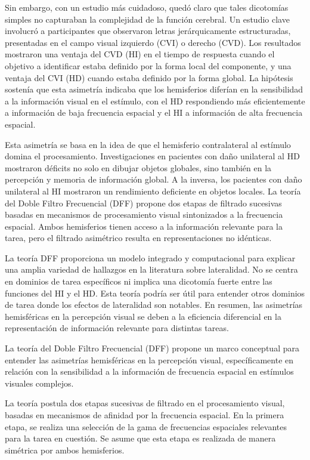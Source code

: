 \documentclass{article}
\begin{document}
	Sin embargo, con un estudio más cuidadoso, quedó claro que tales dicotomías simples no capturaban la complejidad de la función cerebral. Un estudio clave involucró a participantes que observaron letras jerárquicamente estructuradas, presentadas en el campo visual izquierdo (CVI) o derecho (CVD). Los resultados mostraron una ventaja del CVD (HI) en el tiempo de respuesta cuando el objetivo a identificar estaba definido por la forma local del componente, y una ventaja del CVI (HD) cuando estaba definido por la forma global. La hipótesis sostenía que esta asimetría indicaba que los hemisferios diferían en la sensibilidad a la información visual en el estímulo, con el HD respondiendo más eficientemente a información de baja frecuencia espacial y el HI a información de alta frecuencia espacial.
	
	Esta asimetría se basa en la idea de que el hemisferio contralateral al estímulo domina el procesamiento. Investigaciones en pacientes con daño unilateral al HD mostraron déficits no solo en dibujar objetos globales, sino también en la percepción y memoria de información global. A la inversa, los pacientes con daño unilateral al HI mostraron un rendimiento deficiente en objetos locales. La teoría del Doble Filtro Frecuencial (DFF) propone dos etapas de filtrado sucesivas basadas en mecanismos de procesamiento visual sintonizados a la frecuencia espacial. Ambos hemisferios tienen acceso a la información relevante para la tarea, pero el filtrado asimétrico resulta en representaciones no idénticas.
	
	La teoría DFF proporciona un modelo integrado y computacional para explicar una amplia variedad de hallazgos en la literatura sobre lateralidad. No se centra en dominios de tarea específicos ni implica una dicotomía fuerte entre las funciones del HI y el HD. Esta teoría podría ser útil para entender otros dominios de tarea donde los efectos de lateralidad son notables. En resumen, las asimetrías hemisféricas en la percepción visual se deben a la eficiencia diferencial en la representación de información relevante para distintas tareas.
	
	La teoría del Doble Filtro Frecuencial (DFF) propone un marco conceptual para entender las asimetrías hemisféricas en la percepción visual, específicamente en relación con la sensibilidad a la información de frecuencia espacial en estímulos visuales complejos.
	
	La teoría postula dos etapas sucesivas de filtrado en el procesamiento visual, basadas en mecanismos de afinidad por la frecuencia espacial. En la primera etapa, se realiza una selección de la gama de frecuencias espaciales relevantes para la tarea en cuestión. Se asume que esta etapa es realizada de manera simétrica por ambos hemisferios.
	
\end{document}
